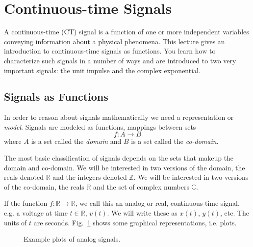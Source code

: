 \section{Continuous-time Signals}

A continuous-time (CT) signal is a function of one or more independent variables conveying information about a physical phenomena. This lecture gives an introduction to continuous-time signals as functions. You learn how to characterize such signals in a number of ways and are introduced to two very important signals: the unit impulse and the complex exponential.

\subsection{Signals as Functions}

In order to reason about signals mathematically we need a representation or {\it model}. Signals are modeled as functions, mappings between sets
\[
f: A \rightarrow B
\]
where $A$ is a set called the {\it domain} and $B$ is a set called the {\it co-domain}.

The most basic classification of signals depends on the sets that makeup the domain and co-domain. We will be interested in two versions of the domain, the reals denoted $\mathbb{R}$ and the integers denoted $\mathbb{Z}$. We will be interested in two versions of the co-domain, the reals $\mathbb{R}$ and the set of complex numbers $\mathbb{C}$.

\begin{definition}
  If the function $f: \mathbb{R} \rightarrow \mathbb{R}$, we call this an analog or real, continuous-time signal, e.g. a voltage at time $t \in \mathbb{R}$, $v(t)$. We will write these as $x(t)$, $y(t)$, etc. The units of $t$ are seconds. Fig.~\ref{fig:ctplots} shows some graphical representations, i.e. plots.
\end{definition}

\begin{figure}[ht]
  \begin{center}
  \end{center}
  \caption{Example plots of analog signals.}
  \label{fig:ctplots}
\end{figure}

